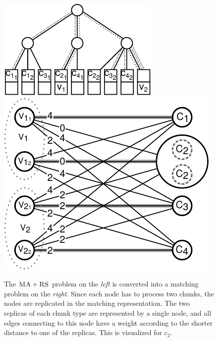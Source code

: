 \documentclass[9pt]{sigcomm-alternate}
\newcommand{\achunk}{\ensuremath{c}}
\newcommand{\RS}{\textsc{RS}}
\newcommand{\MA}{\textsc{MA}}
\begin{document}
\begin{figure}
\includegraphics[width = 0.49\columnwidth]{figs/model_ma_r_cv_boxes}
\hfill
\includegraphics[width =0.49\columnwidth]{figs/matching}
\caption{The $\MA+\RS$ problem on the \emph{left} is converted into a
matching problem on the \emph{right}. Since each node has to process two 
chunks, the
nodes are replicated in the matching representation. The two replicas of each
chunk type are represented by a single node, and all edges connecting to this
node have a weight according to the shorter distance to one of the replicas.
This is visualized for $\achunk_2$.}
\label{fig:matching}
\end{figure}
\end{document}
